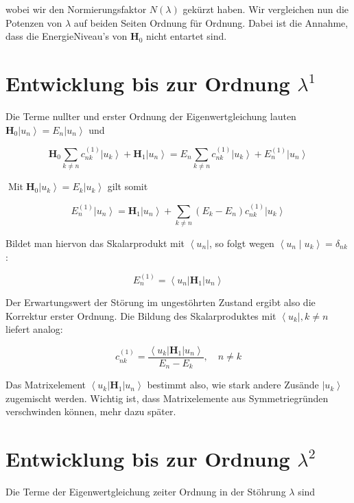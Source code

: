 \documentclass[10pt, letterpaper]{article}
\begin{document}
wobei wir den Normierungsfaktor $N(\lambda)$ gekürzt haben. Wir vergleichen nun die Potenzen von $\lambda$ auf beiden Seiten Ordnung für Ordnung. Dabei ist die Annahme, dass die EnergieNiveau's von $\mathbf{H}_{0}$ nicht entartet sind.

\section*{Entwicklung bis zur Ordnung $\lambda^{1}$}
Die Terme nullter und erster Ordnung der Eigenwertgleichung lauten $\mathbf{H}_{0}\left|u_{n}\right\rangle=E_{n}\left|u_{n}\right\rangle$ und

$$
\mathbf{H}_{0} \sum_{k \neq n} c_{n k}^{(1)}\left|u_{k}\right\rangle+\mathbf{H}_{1}\left|u_{n}\right\rangle=E_{n} \sum_{k \neq n} c_{n k}^{(1)}\left|u_{k}\right\rangle+E_{n}^{(1)}\left|u_{n}\right\rangle
$$

$\operatorname{Mit} \mathbf{H}_{0}\left|u_{k}\right\rangle=E_{k}\left|u_{k}\right\rangle$ gilt somit

$$
E_{n}^{(1)}\left|u_{n}\right\rangle=\mathbf{H}_{1}\left|u_{n}\right\rangle+\sum_{k \neq n}\left(E_{k}-E_{n}\right) c_{n k}^{(1)}\left|u_{k}\right\rangle
$$

Bildet man hiervon das Skalarprodukt mit $\left\langle u_{n}\right|$, so folgt wegen $\left\langle u_{n} \mid u_{k}\right\rangle=\delta_{n k}$ :

$$
E_{n}^{(1)}=\left\langle u_{n}\right| \mathbf{H}_{1}\left|u_{n}\right\rangle
$$

Der Erwartungswert der Störung im ungestöhrten Zustand ergibt also die Korrektur erster Ordnung. Die Bildung des Skalarproduktes mit $\left\langle u_{k}\right|, k \neq n$ liefert analog:

$$
c_{n k}^{(1)}=\frac{\left\langle u_{k}\right| \mathbf{H}_{1}\left|u_{n}\right\rangle}{E_{n}-E_{k}}, \quad n \neq k
$$

Das Matrixelement $\left\langle u_{k}\right| \mathbf{H}_{1}\left|u_{n}\right\rangle$ bestimmt also, wie stark andere Zusände $\left|u_{k}\right\rangle$ zugemischt werden. Wichtig ist, dass Matrixelemente aus Symmetriegründen verschwinden können, mehr dazu später.

\section*{Entwicklung bis zur Ordnung $\lambda^{2}$}
Die Terme der Eigenwertgleichung zeiter Ordnung in der Stöhrung $\lambda$ sind
\end{document}
